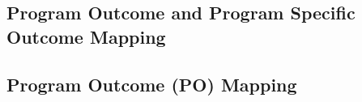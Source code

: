 \documentclass[12pt,a4]{report}
\makeatletter
\def\@makechapterhead#1{%
  \vspace*{\fill}%
  \begin{center}
    {\Huge\bfseries CHAPTER \thechapter\\[1.5ex]#1}
  \end{center}
  \thispagestyle{chaptertitle}%
  \vspace*{\fill}
  \clearpage
}
\makeatother
\begin{document}
\clearpage
{}
\pagestyle{empty}

\makeatletter
\renewcommand{\@chapapp}{Annexure}
\renewcommand{\thechapter}{\Alph{chapter}}
\makeatother

\makeatletter
\renewcommand{\@makechapterhead}[1]{%
  \vspace*{\fill}%
  \begin{center}
    {\Huge\bfseries Annexure \thechapter\\[1.5ex]#1}
  \end{center}
  \thispagestyle{chaptertitle}%
  \vspace*{\fill}
  \clearpage
}
\makeatother

\begin{appendices}

\chapter{Program Outcome and Program Specific Outcome Mapping}

\section{Program Outcome (PO) Mapping}


\end{appendices}
\end{document}
